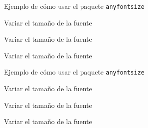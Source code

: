 \documentclass{article}
\begin{document}
Ejemplo de cómo usar el paquete \verb+anyfontsize+\par
{\fontsize{0.1cm}{0.1cm}\selectfont Variar el tama\~no de la fuente\par}

{\fontsize{0.3cm}{0.06cm}\selectfont Variar el tama\~no de la fuente\par}

{\fontsize{0.6cm}{0.12cm}\selectfont Variar el tama\~no de la fuente\par}

\bigskip
Ejemplo de cómo usar el paquete \verb+anyfontsize+\par
{\fontsize{0.3cm}{0.5cm}\selectfont Variar el tama\~no de la fuente\par}

{\fontsize{0.3cm}{0.5cm}\selectfont Variar el tama\~no de la fuente\par}

{\fontsize{0.6cm}{0.5cm}\selectfont Variar el tama\~no de la fuente\par}
\end{document}
